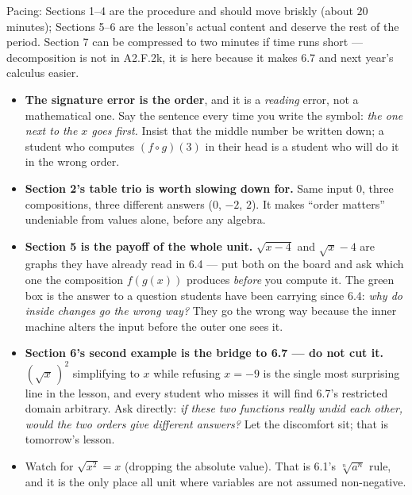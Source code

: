 \documentclass[10pt]{article}
\begin{document}
\begin{teachernote}
\small Pacing: Sections 1--4 are the procedure and should move briskly (about $20$ minutes);
Sections 5--6 are the lesson's actual content and deserve the rest of the period. Section 7 can be
compressed to two minutes if time runs short --- decomposition is not in A2.F.2k, it is here because
it makes 6.7 and next year's calculus easier.
\begin{itemize}[leftmargin=1.3em, nosep]
  \item \textbf{The signature error is the order}, and it is a \emph{reading} error, not a
        mathematical one. Say the sentence every time you write the symbol: \emph{the one next to
        the $x$ goes first.} Insist that the middle number be written down; a student who computes
        $(f\circ g)(3)$ in their head is a student who will do it in the wrong order.
  \item \textbf{Section 2's table trio is worth slowing down for.} Same input $0$, three
        compositions, three different answers ($0$, $-2$, $2$). It makes ``order matters''
        undeniable from values alone, before any algebra.
  \item \textbf{Section 5 is the payoff of the whole unit.} $\sqrt{x-4}$ and $\sqrt{x}-4$ are graphs
        they have already read in 6.4 --- put both on the board and ask which one the composition
        $f(g(x))$ produces \emph{before} you compute it. The green box is the answer to a question
        students have been carrying since 6.4: \emph{why do inside changes go the wrong way?} They go
        the wrong way because the inner machine alters the input before the outer one sees it.
  \item \textbf{Section 6's second example is the bridge to 6.7 --- do not cut it.}
        $\left(\sqrt{x}\,\right)^{2}$ simplifying to $x$ while refusing $x=-9$ is the single most
        surprising line in the lesson, and every student who misses it will find 6.7's restricted
        domain arbitrary. Ask directly: \emph{if these two functions really undid each other, would
        the two orders give different answers?} Let the discomfort sit; that is tomorrow's lesson.
  \item Watch for $\sqrt{x^{2}}=x$ (dropping the absolute value). That is 6.1's
        $\sqrt[n]{a^{n}}$ rule, and it is the only place all unit where variables are not assumed
        non-negative.
\end{itemize}
\end{teachernote}
\end{document}
